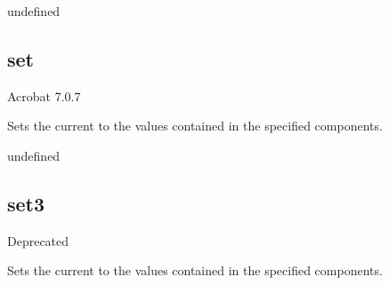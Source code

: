 \documentclass[letterpaper,12pt,english,openany,oneside]{sphinxmanual}
\begin{document}
\label{\detokenize{JS_3D_API:syntax-140}}

\begin{sphinxVerbatim}[commandchars=\\\{\}]
\end{sphinxVerbatim}
\label{\detokenize{JS_3D_API:parameters-101}}

\label{\detokenize{JS_3D_API:section-139}}\label{\detokenize{JS_3D_API:returns-141}}

undefined


\subsection{set}
\label{\detokenize{JS_3D_API:set-6}}\label{\detokenize{JS_3D_API:id50}}
Acrobat 7.0.7

Sets the current  to the values contained in the specified components.

\label{\detokenize{JS_3D_API:syntax-141}}

\begin{sphinxVerbatim}[commandchars=\\\{\}]
  
\end{sphinxVerbatim}
\label{\detokenize{JS_3D_API:parameters-102}}

\label{\detokenize{JS_3D_API:section-140}}\label{\detokenize{JS_3D_API:returns-142}}

undefined


\subsection{set3}
\label{\detokenize{JS_3D_API:set3-1}}\label{\detokenize{JS_3D_API:id51}}
Deprecated

Sets the current  to the values contained in the specified components.

\label{\detokenize{JS_3D_API:syntax-142}}

\begin{sphinxVerbatim}[commandchars=\\\{\}]
  
\end{sphinxVerbatim}
\label{\detokenize{JS_3D_API:parameters-103}}
\end{document}
